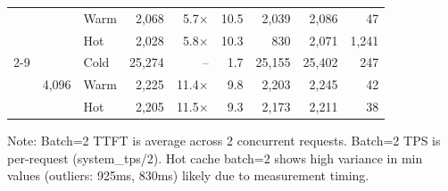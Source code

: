 \begin{table}[t]
\begin{tabular}{rrlrrrrrr}
  &                        & Warm & 2,068  & 5.7×  & 10.5 & 2,039  & 2,086  & 47 \\
  &                        & Hot  & 2,028  & 5.8×  & 10.3 & 830    & 2,071  & 1,241 \\
\cmidrule{2-9}
  & \multirow{3}{*}{4,096} & Cold & 25,274 & --    & 1.7  & 25,155 & 25,402 & 247 \\
  &                        & Warm & 2,225  & 11.4× & 9.8  & 2,203  & 2,245  & 42 \\
  &                        & Hot  & 2,205  & 11.5× & 9.3  & 2,173  & 2,211  & 38 \\
\bottomrule
\end{tabular}
\vspace{0.5em}
\small
Note: Batch=2 TTFT is average across 2 concurrent requests. Batch=2 TPS is per-request (system\_tps/2).
Hot cache batch=2 shows high variance in min values (outliers: 925ms, 830ms) likely due to measurement timing.
\end{table}

